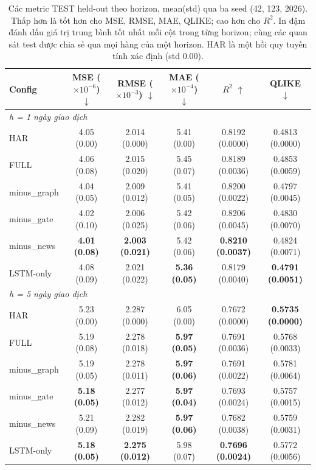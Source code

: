 \documentclass[runningheads]{llncs}
\begin{document}
\begin{table}[t]
\caption{Các metric TEST held-out theo horizon, mean(std) qua ba seed (42, 123, 2026). Thấp hơn là tốt
hơn cho MSE, RMSE, MAE, QLIKE; cao hơn cho $R^2$. In đậm đánh dấu giá trị trung bình tốt nhất mỗi cột
trong từng horizon; cùng các quan sát test được chia sẻ qua mọi hàng của một horizon. HAR là một hồi quy
tuyến tính xác định (std 0.00).}
\label{tab:metrics}
\centering
\begin{tabular}{lccccc}
\toprule
Config & MSE ($\times10^{-6}$) $\downarrow$ & RMSE ($\times10^{-3}$) $\downarrow$ & MAE ($\times10^{-4}$) $\downarrow$ & $R^2$ $\uparrow$ & QLIKE $\downarrow$ \\
\midrule
\multicolumn{6}{l}{\textit{h = 1 ngày giao dịch}}\\
HAR         & 4.05 (0.00) & 2.014 (0.000) & 5.41 (0.00) & 0.8192 (0.0000) & 0.4813 (0.0000) \\
FULL        & 4.06 (0.08) & 2.015 (0.020) & 5.45 (0.07) & 0.8189 (0.0036) & 0.4853 (0.0059) \\
minus\_graph & 4.04 (0.05) & 2.009 (0.012) & 5.41 (0.05) & 0.8200 (0.0022) & 0.4797 (0.0045) \\
minus\_gate  & 4.02 (0.10) & 2.006 (0.025) & 5.42 (0.06) & 0.8206 (0.0045) & 0.4830 (0.0070) \\
minus\_news  & \textbf{4.01 (0.08)} & \textbf{2.003 (0.021)} & 5.42 (0.06) & \textbf{0.8210 (0.0037)} & 0.4824 (0.0071) \\
LSTM-only   & 4.08 (0.09) & 2.021 (0.022) & \textbf{5.36 (0.05)} & 0.8179 (0.0040) & \textbf{0.4791 (0.0051)} \\
\midrule
\multicolumn{6}{l}{\textit{h = 5 ngày giao dịch}}\\
HAR         & 5.23 (0.00) & 2.287 (0.000) & 6.05 (0.00) & 0.7672 (0.0000) & \textbf{0.5735 (0.0000)} \\
FULL        & 5.19 (0.08) & 2.278 (0.018) & \textbf{5.97 (0.05)} & 0.7691 (0.0036) & 0.5768 (0.0033) \\
minus\_graph & 5.19 (0.05) & 2.278 (0.011) & \textbf{5.97 (0.06)} & 0.7691 (0.0022) & 0.5781 (0.0064) \\
minus\_gate  & \textbf{5.18 (0.05)} & 2.277 (0.012) & \textbf{5.97 (0.04)} & 0.7693 (0.0024) & 0.5757 (0.0015) \\
minus\_news  & 5.21 (0.09) & 2.282 (0.019) & \textbf{5.97 (0.06)} & 0.7682 (0.0038) & 0.5759 (0.0031) \\
LSTM-only   & \textbf{5.18 (0.05)} & \textbf{2.275 (0.012)} & 5.98 (0.07) & \textbf{0.7696 (0.0024)} & 0.5772 (0.0056) \\

\end{tabular}
\end{table}
\end{document}
